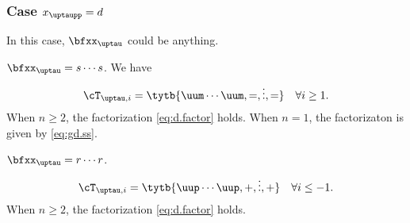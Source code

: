 \documentclass[ssunip]{subfiles}
\begin{document}
{  \subsubsection{Case $x_{\uptaupp}=d$}\label{sec:z.d}
  In this case, $\bfxx_{\uptau}$ could be anything.
  \begin{enumT}
    \item $\bfxx_{\uptau}=s\cdots s$. We have
    \[
      \cT_{\uptau,i} = \tytb{\uum\cdots\uum,=,\vdots,=} \quad \forall i\geq 1.
    \]
    When $n\geq 2$, the factorization \eqref{eq:d.factor} holds.
    When $n=1$, the factorizaton is given by \eqref{eq:gd.ss}.
    \item $\bfxx_{\uptau}=r\cdots r$.
    \[
      \cT_{\uptau,i} = \tytb{\uup\cdots\uup,+,\vdots,+} \quad \forall i\leq -1.
    \]
    When $n\geq 2$, the factorization \eqref{eq:d.factor} holds.


\end{enumT}}
\end{document}
